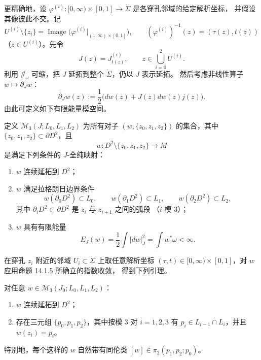 更精确地，设
$\varphi^{(i)}:[0,\infty)\times[0,1]\to\dot\Sigma$ 是各穿孔邻域的给定解析坐标，
并假设其像彼此不交。记
\[
 U^{(i)}\setminus\{z_i\}
 =\operatorname{Image}\bigl(\varphi^{(i)}|_{(1,\infty)\times[0,1]}\bigr),
 \qquad
 (\varphi^{(i)})^{-1}(z)=(\tau(z),t(z))
\]
（$z\in U^{(i)}$）。先令
\begin{equation}
 J(z)=J_{t(z)}^{(i)},\qquad z\in\bigcup_{i=0}^2U^{(i)}.
\label{eq:domain-dependent-j-near-ends}
\end{equation}
利用 $\mathcal J_\omega$ 可缩，把 $J$ 延拓到整个 $\dot\Sigma$，仍以 $J$ 表示延拓。
然后考虑非线性算子 $w\mapsto\overline\partial_Jw$：
\begin{equation}
 \overline\partial_Jw(z)
 :=\frac12\bigl(dw(z)+J(z)dw(z)j(z)\bigr).
\label{eq:domain-dependent-dbar}
\end{equation}
由此可定义如下有限能量模空间。

\begin{definition}
\label{def:holomorphic-triangle-moduli}
定义 $\mathcal M_3(J;L_0,L_1,L_2)$ 为所有对子
$(w,\{z_0,z_1,z_2\})$ 的集合，其中 $\{z_0,z_1,z_2\}\subset\partial D^2$，且
\[
 w:D^2\setminus\{z_0,z_1,z_2\}\longrightarrow M
\]
是满足下列条件的 $J$-全纯映射：
\begin{enumerate}[label=(\arabic*)]
\item $w$ 连续延拓到 $D^2$；
\item $w$ 满足拉格朗日边界条件
\[
 w(\partial_0D^2)\subset L_0,\qquad
 w(\partial_1D^2)\subset L_1,\qquad
 w(\partial_2D^2)\subset L_2,
\]
其中 $\partial_iD^2\subset\partial D^2$ 是 $z_i$ 与 $z_{i+1}$ 之间的弧段
（$i$ 模 $3$）；
\item $w$ 具有有限能量
\[
 E_J(w)=\frac12\int|dw|_J^2=\int w^*\omega<\infty.
\]
\end{enumerate}
\end{definition}

在穿孔 $z_i$ 附近的邻域 $U_i\subset\dot\Sigma$ 上取任意解析坐标
$(\tau,t)\in[0,\infty)\times[0,1]$，对 $w$ 应用命题 14.1.5 所确立的指数收敛，
得到下列引理。

\begin{lemma}
\label{lem:holomorphic-triangle-asymptotics}
对任意 $w\in\mathcal M_3(J_0;L_0,L_1,L_2)$：
\begin{enumerate}[label=(\arabic*)]
\item $w$ 连续延拓到 $D^2$；
\item 存在三元组 $\{p_0,p_1,p_2\}$，其中按模 $3$ 对 $i=1,2,3$ 有
$p_i\in L_{i-1}\cap L_i$，并且 $w(z_i)=p_i$。
\end{enumerate}
特别地，每个这样的 $w$ 自然带有同伦类 $[w]\in\pi_2(p_1,p_2;p_0)$。
\end{lemma}

